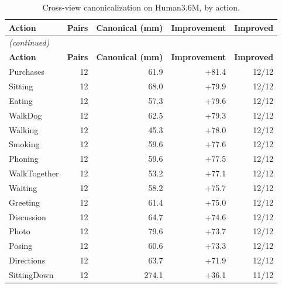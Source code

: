 \begin{center}
{\fontsize{10}{12}\selectfont
\begin{longtable}{lrrrr}
\caption{Cross-view canonicalization on Human3.6M, by action.}\label{tab:appcvaction}\\
\hline
\textbf{Action} & \textbf{Pairs} & \textbf{Canonical (mm)} & \textbf{Improvement} & \textbf{Improved} \\
\hline
\endfirsthead
\multicolumn{5}{l}{\textit{(continued)}}\\
\hline
\textbf{Action} & \textbf{Pairs} & \textbf{Canonical (mm)} & \textbf{Improvement} & \textbf{Improved} \\
\hline
\endhead
\hline
\endfoot
Purchases & 12 & 61.9 & +81.4 & 12/12 \\
Sitting & 12 & 68.0 & +79.9 & 12/12 \\
Eating & 12 & 57.3 & +79.6 & 12/12 \\
WalkDog & 12 & 62.5 & +79.3 & 12/12 \\
Walking & 12 & 45.3 & +78.0 & 12/12 \\
Smoking & 12 & 59.6 & +77.6 & 12/12 \\
Phoning & 12 & 59.6 & +77.5 & 12/12 \\
WalkTogether & 12 & 53.2 & +77.1 & 12/12 \\
Waiting & 12 & 58.2 & +75.7 & 12/12 \\
Greeting & 12 & 61.4 & +75.0 & 12/12 \\
Discussion & 12 & 64.7 & +74.6 & 12/12 \\
Photo & 12 & 79.6 & +73.7 & 12/12 \\
Posing & 12 & 60.6 & +73.3 & 12/12 \\
Directions & 12 & 63.7 & +71.9 & 12/12 \\
SittingDown & 12 & 274.1 & +36.1 & 11/12 \\
\end{longtable}
}
\end{center}

\vspace{0.6cm}

